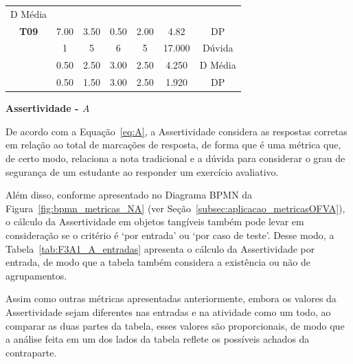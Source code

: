 \begin{table}[htbp]
\begin{tabular}{|ccccccc|}
		D Média \\ \cline{2-7} 
		\multicolumn{1}{|c|}{\multirow{-3}{*}{\cellcolor[HTML]{F2F2F2}\textbf{T09}}} &
		\multicolumn{1}{c|}{7.00} &
		\multicolumn{1}{c|}{3.50} &
		\multicolumn{1}{c|}{0.50} &
		\multicolumn{1}{c|}{2.00} &
		\multicolumn{1}{c|}{4.82} &
		DP \\ \hline
		\rowcolor[HTML]{D9D9D9} 
		\multicolumn{1}{|c|}{\cellcolor[HTML]{F2F2F2}} &
		\multicolumn{1}{c|}{\cellcolor[HTML]{D9D9D9}1} &
		\multicolumn{1}{c|}{\cellcolor[HTML]{D9D9D9}5} &
		\multicolumn{1}{c|}{\cellcolor[HTML]{D9D9D9}6} &
		\multicolumn{1}{c|}{\cellcolor[HTML]{D9D9D9}5} &
		\multicolumn{1}{c|}{\cellcolor[HTML]{D9D9D9}17.000} &
		Dúvida \\ \cline{2-7} 
		\multicolumn{1}{|c|}{\cellcolor[HTML]{F2F2F2}} &
		\multicolumn{1}{c|}{0.50} &
		\multicolumn{1}{c|}{2.50} &
		\multicolumn{1}{c|}{3.00} &
		\multicolumn{1}{c|}{2.50} &
		\multicolumn{1}{c|}{4.250} &
		D Média \\ \cline{2-7} 
		\rowcolor[HTML]{D9D9D9} 
		\multicolumn{1}{|c|}{\multirow{-3}{*}{\cellcolor[HTML]{F2F2F2}\textbf{T10}}} &
		\multicolumn{1}{c|}{\cellcolor[HTML]{D9D9D9}0.50} &
		\multicolumn{1}{c|}{\cellcolor[HTML]{D9D9D9}1.50} &
		\multicolumn{1}{c|}{\cellcolor[HTML]{D9D9D9}3.00} &
		\multicolumn{1}{c|}{\cellcolor[HTML]{D9D9D9}2.50} &
		\multicolumn{1}{c|}{\cellcolor[HTML]{D9D9D9}1.920} &
		DP \\ \hline
	\end{tabular}
	\label{tab:F3A1_Duvida_casos_comagrupamento}
\end{table}

\textbf{Assertividade - $A$}

De acordo com a Equação~\ref{eq:A}, a Assertividade considera as respostas corretas em relação ao total de marcações de resposta, de forma que é uma métrica que, de certo modo, relaciona a nota tradicional e a dúvida para considerar o grau de segurança de um estudante ao responder um exercício avaliativo.


Além disso, conforme apresentado no Diagrama BPMN da Figura~\ref{fig:bpmn_metricas_NA} (ver Seção~\ref{subsec:aplicacao_metricasOFVA}), o cálculo da Assertividade em objetos tangíveis também pode levar em consideração se o critério é `por entrada' ou `por caso de teste'. Desse modo, a Tabela~\ref{tab:F3A1_A_entradas} apresenta o cálculo da Assertividade por entrada, de modo que a tabela também considera a existência ou não de agrupamentos.

Assim como outras métricas apresentadas anteriormente, embora os valores da Assertividade sejam diferentes nas entradas e na atividade como um todo, ao comparar as duas partes da tabela, esses valores são proporcionais, de modo que a análise feita em um dos lados da tabela reflete os possíveis achados da contraparte.

